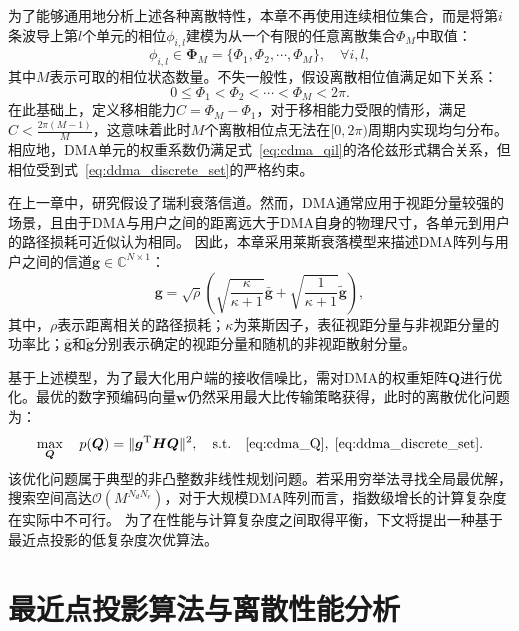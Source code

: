 为了能够通用地分析上述各种离散特性，本章不再使用连续相位集合，而是将第$i$条波导上第$l$个单元的相位$\phi_{i,l}$建模为从一个有限的任意离散集合$\Phi_M$中取值：
\begin{equation}\label{eq:ddma_discrete_set}
	\phi_{i,l} \in \bm \Phi_M = \{\Phi_1, \Phi_2, \cdots, \Phi_M\}, \quad \forall i, l,
\end{equation}
其中$M$表示可取的相位状态数量。不失一般性，假设离散相位值满足如下关系：
\begin{equation}
	0 \le \Phi_1 < \Phi_2 < \cdots < \Phi_M < 2\pi.
\end{equation}
在此基础上，定义移相能力$C=\Phi_M-\Phi_1$，对于移相能力受限的情形，满足$C<\frac{2\pi(M-1)}{M}$，这意味着此时$M$个离散相位点无法在$[0, 2\pi)$周期内实现均匀分布。
相应地，DMA单元的权重系数仍满足式~\eqref{eq:cdma_qil}的洛伦兹形式耦合关系，但相位受到式~\eqref{eq:ddma_discrete_set}的严格约束。

在上一章中，研究假设了瑞利衰落信道。然而，DMA通常应用于视距分量较强的场景，且由于DMA与用户之间的距离远大于DMA自身的物理尺寸，各单元到用户的路径损耗可近似认为相同。
因此，本章采用莱斯衰落模型来描述DMA阵列与用户之间的信道$\bm g \in \mathbb{C}^{N \times 1}$：
\begin{equation}\label{eq:ddma_rician_channel}
	\bm g = \sqrt{\rho} \left( \sqrt{\frac{\kappa}{\kappa+1}}\bar{\bm g} + \sqrt{\frac{1}{\kappa+1}}\tilde{\bm g} \right),
\end{equation}
其中，$\rho$表示距离相关的路径损耗；$\kappa$为莱斯因子，表征视距分量与非视距分量的功率比；$\bar{\bm g}$和$\tilde{\bm g}$分别表示确定的视距分量和随机的非视距散射分量。

基于上述模型，为了最大化用户端的接收信噪比，需对DMA的权重矩阵$\bm Q$进行优化。最优的数字预编码向量$\bm w$仍然采用最大比传输策略获得，此时的离散优化问题为：
\begin{equation}\label{eq:ddma_pQ}
	\max_{\bm{Q}} \quad  p(\bm{Q})=\|\bm{g}^\mathrm{T} \bm{HQ}\|^2,
	\quad \text{s.t.} \quad  \eqref{eq:cdma_Q}, \;
	\eqref{eq:ddma_discrete_set}.
\end{equation}
该优化问题属于典型的非凸整数非线性规划问题。若采用穷举法寻找全局最优解，搜索空间高达$\mathcal{O}(M^{N_d N_e})$，对于大规模DMA阵列而言，指数级增长的计算复杂度在实际中不可行。
为了在性能与计算复杂度之间取得平衡，下文将提出一种基于最近点投影的低复杂度次优算法。

\section{最近点投影算法与离散性能分析}\label{sec:ddma_cpp}


